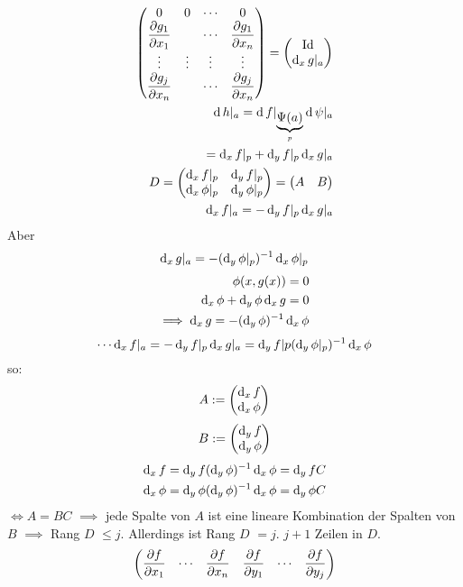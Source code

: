 \begin{Bew}
\begin{eqnarray*}
\begin{pmatrix}
      0&0&\cdots&0\\
      \dfrac{\partial g_1}{\partial x_1}&&\cdots&\dfrac{\partial g_1}{\partial x_n}\\
      \vdots&\vdots&\vdots&\vdots\\
      \dfrac{\partial g_j}{\partial x_n}&&\cdots&\dfrac{\partial g_j}{\partial x_n}
    \end{pmatrix} = \begin{pmatrix}
      \operatorname{Id}\\
      \operatorname{d}_xg|_a
    \end{pmatrix}\\
    \operatorname{d} h|_a=\operatorname{d} f|_{\underbrace{\Psi(a)}_p}\operatorname{d} \psi|_a\\
    = \operatorname{d}_x f|_p+\operatorname{d}_yf|_p\operatorname{d}_xg|_a\\
    D=\begin{pmatrix}
      \operatorname{d}_xf|_p&\operatorname{d}_yf|_p\\
      \operatorname{d}_x\phi|_p&\operatorname{d}_y\phi|_p
    \end{pmatrix}= \begin{pmatrix}
      A&B
    \end{pmatrix}\\
    \operatorname{d}_xf|_a=-\operatorname{d}_yf|_p\operatorname{d}_xg|_a
  \end{eqnarray*}
  Aber 
  \[\operatorname{d}_xg|_a=-(\operatorname{d}_y\phi|_p)^{-1}\operatorname{d}_x\phi|_p\]
  \begin{eqnarray*}
    \phi(x,g(x))=0\\
    \operatorname{d}_x\phi+\operatorname{d}_y\phi\operatorname{d}_xg=0\\
    \implies \operatorname{d}_xg=-(\operatorname{d}_y\phi)^{-1}\operatorname{d}_x\phi
  \end{eqnarray*}
  \[ \cdots \operatorname{d}_xf|_a=-\operatorname{d}_yf|_p\operatorname{d}_xg|_a=\operatorname{d}_yf|p(\operatorname{d}_y\phi|_p)^{-1}\operatorname{d}_x\phi\]
  so:
  \[A:=\begin{pmatrix}
    \operatorname{d}_x f\\
    \operatorname{d}_x\phi
  \end{pmatrix}\]
  \[B:= \begin{pmatrix}
    \operatorname{d}_yf\\
    \operatorname{d}_y\phi
  \end{pmatrix}\]
  \begin{eqnarray*}
    \operatorname{d}_xf&=\operatorname{d}_yf(\operatorname{d}_y\phi)^{-1}\operatorname{d}_x\phi=\operatorname{d}_yf C\\
    \operatorname{d}_x\phi&=\operatorname{d}_y\phi(\operatorname{d}_y\phi)^{-1}\operatorname{d}_x\phi=\operatorname{d}_y\phi C
  \end{eqnarray*}
  $\iff A=BC$ $\implies$ jede Spalte von $A$ ist eine lineare Kombination der Spalten von $B$ $\implies$ Rang $D$ $\leq j$. Allerdings ist Rang $D$ $=j$. $j+1$ Zeilen in $D$.
  \[\begin{pmatrix}
    \dfrac{\partial f}{\partial x_1}&\cdots&\dfrac{\partial f}{\partial x_n}&\dfrac{\partial f}{\partial y_1}&\cdots&\dfrac{\partial f}{\partial y_j}\\

\end{pmatrix}\]
\end{Bew}
